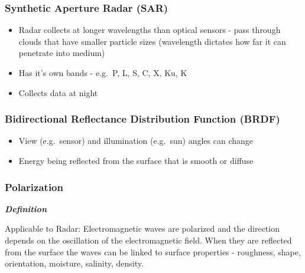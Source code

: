 \documentclass[
  letterpaper,
  DIV=11,
  numbers=noendperiod]{scrreprt}
\providecommand{\tightlist}{%
  \setlength{\itemsep}{0pt}\setlength{\parskip}{0pt}}\usepackage{longtable,booktabs,array}
\begin{document}
\hypertarget{synthetic-aperture-radar-sar}{%
\subsubsection*{\texorpdfstring{\textbf{Synthetic Aperture Radar
(SAR)}}{Synthetic Aperture Radar (SAR)}}\label{synthetic-aperture-radar-sar}}

\begin{itemize}
\tightlist
\item
  Radar collects at longer wavelengths than optical sensors - pass
  through clouds that have smaller particle sizes (wavelength dictates
  how far it can penetrate into medium)
\item
  Has it's own bands - e.g.~P, L, S, C, X, Ku, K
\item
  Collects data at night
\end{itemize}

\hypertarget{bidirectional-reflectance-distribution-function-brdf}{%
\subsubsection*{\texorpdfstring{\textbf{Bidirectional Reflectance
Distribution Function
(BRDF)}}{Bidirectional Reflectance Distribution Function (BRDF)}}\label{bidirectional-reflectance-distribution-function-brdf}}

\begin{itemize}
\tightlist
\item
  View (e.g.~sensor) and illumination (e.g.~sun) angles can change
\item
  Energy being reflected from the surface that is smooth or diffuse
\end{itemize}

\hypertarget{polarization}{%
\subsubsection*{\texorpdfstring{\textbf{Polarization}}{Polarization}}\label{polarization}}

\textbf{\emph{Definition}}

Applicable to Radar: Electromagnetic waves are polarized and the
direction depends on the oscillation of the electromagnetic field. When
they are reflected from the surface the waves can be linked to surface
properties - roughness, shape, orientation, moisture, salinity, density.
\end{document}
